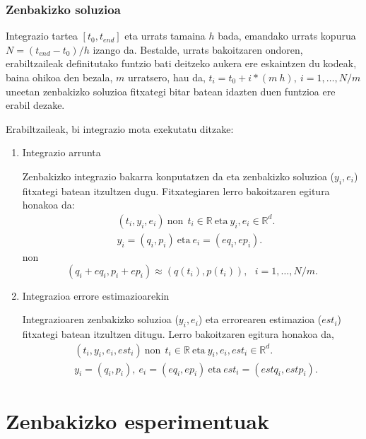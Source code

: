 \subsubsection*{Zenbakizko soluzioa}  

Integrazio tartea $[t_0,t_{end}]$ eta urrats tamaina $h$ bada, emandako urrats kopurua $N=(t_{end}-t_0)/h$ izango da. Bestalde, urrats bakoitzaren ondoren, erabiltzaileak definitutako funtzio bati deitzeko aukera ere eskaintzen du kodeak, baina ohikoa den bezala, $m$ urratsero, hau da, $t_i=t_0+i*(m \ h), \ i=1,\dots,N/m$ uneetan zenbakizko soluzioa fitxategi bitar batean idazten duen funtzioa ere erabil dezake.

Erabiltzaileak, bi integrazio mota exekutatu ditzake:
\begin{enumerate}
\item Integrazio arrunta

Zenbakizko integrazio bakarra konputatzen da eta zenbakizko soluzioa ($y_i,e_i$) fitxategi batean itzultzen dugu. Fitxategiaren lerro bakoitzaren egitura honakoa da:
\begin{align*}
& (t_i,y_i,e_i) \ \text{non} \ \ t_i \in \mathbb{R} \ \text{eta} \ y_i,e_i \in \mathbb{R}^d.\\
& y_i=(q_i,p_i) \ \text{eta} \ e_i=(eq_i,ep_i).
\end{align*}
non
\begin{equation*}
(q_i+eq_i,p_i+ep_i)\approx(q(t_i),p(t_i)), \ \ \ i=1,\dots,N/m.
\end{equation*}

\item Integrazioa errore estimazioarekin

Integrazioaren zenbakizko soluzioa ($y_i,e_i$) eta errorearen estimazioa ($est_i$)  fitxategi batean itzultzen ditugu. Lerro bakoitzaren egitura honakoa da,
\begin{align*}
& (t_i,y_i,e_i,est_i) \ \text{non} \ \ t_i \in \mathbb{R} \ \text{eta} \ y_i,e_i,est_i \in \mathbb{R}^d.\\
&  y_i=(q_i,p_i), \ e_i=(eq_i,ep_i) \ \text{eta} \ est_i=(estq_i,estp_i).
\end{align*}

\end{enumerate}


\clearpage


\section{Zenbakizko esperimentuak}

